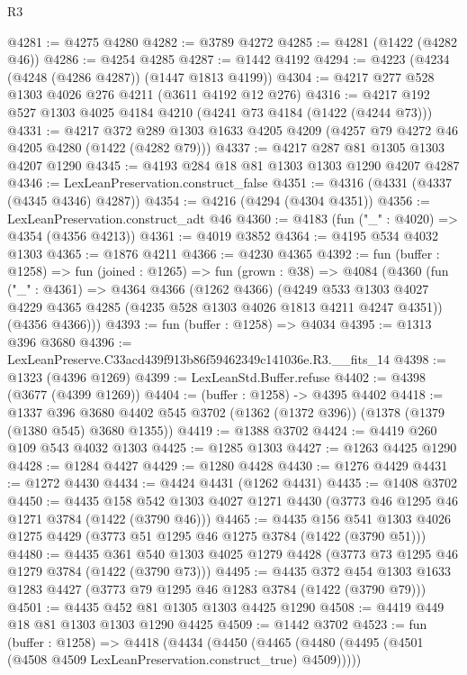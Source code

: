 \begin{lexlean}{R3}
\begin{coremodule}
@4281 := @4275 @4280
@4282 := @3789 @4272
@4285 := @4281 (@1422 (@4282 @46))
@4286 := @4254 @4285
@4287 := @1442 @4192
@4294 := @4223 (@4234 (@4248 (@4286 @4287)) (@1447 @1813 @4199))
@4304 := @4217 @277 @528 @1303 @4026 @276 @4211 (@3611 @4192 @12 @276)
@4316 := @4217 @192 @527 @1303 @4025 @4184 @4210 (@4241 @73 @4184 (@1422 (@4244 @73)))
@4331 := @4217
    @372
    @289
    @1303
    @1633
    @4205
    @4209
    (@4257 @79 @4272 @46 @4205 @4280 (@1422 (@4282 @79)))
@4337 := @4217 @287 @81 @1305 @1303 @4207 @1290
@4345 := @4193 @284 @18 @81 @1303 @1303 @1290 @4207 @4287
@4346 := LexLeanPreservation.construct_false
@4351 := @4316 (@4331 (@4337 (@4345 @4346) @4287))
@4354 := @4216 (@4294 (@4304 @4351))
@4356 := LexLeanPreservation.construct_adt @46
@4360 := @4183 (fun ("_" : @4020) => @4354 (@4356 @4213))
@4361 := @4019 @3852
@4364 := @4195 @534 @4032 @1303
@4365 := @1876 @4211
@4366 := @4230 @4365
@4392 := fun (buffer : @1258) =>
  fun (joined : @1265) =>
  fun (grown : @38) =>
  @4084
    (@4360
      (fun ("_" : @4361) =>
      @4364
        @4366
        (@1262 @4366)
        (@4249 @533 @1303 @4027 @4229 @4365 @4285 (@4235 @528 @1303 @4026 @1813 @4211 @4247 @4351))
        (@4356 @4366)))
@4393 := fun (buffer : @1258) => @4034
@4395 := @1313 @396 @3680
@4396 := LexLeanPreserve.C33acd439f913b86f59462349c141036e.R3.__fits_14
@4398 := @1323 (@4396 @1269)
@4399 := LexLeanStd.Buffer.refuse
@4402 := @4398 (@3677 (@4399 @1269))
@4404 := (buffer : @1258) -> @4395 @4402
@4418 := @1337
    @396
    @3680
    @4402
    @545
    @3702
    (@1362 (@1372 @396))
    (@1378 (@1379 (@1380 @545) @3680 @1355))
@4419 := @1388 @3702
@4424 := @4419 @260 @109 @543 @4032 @1303
@4425 := @1285 @1303
@4427 := @1263 @4425 @1290
@4428 := @1284 @4427
@4429 := @1280 @4428
@4430 := @1276 @4429
@4431 := @1272 @4430
@4434 := @4424 @4431 (@1262 @4431)
@4435 := @1408 @3702
@4450 := @4435
    @158
    @542
    @1303
    @4027
    @1271
    @4430
    (@3773 @46 @1295 @46 @1271 @3784 (@1422 (@3790 @46)))
@4465 := @4435
    @156
    @541
    @1303
    @4026
    @1275
    @4429
    (@3773 @51 @1295 @46 @1275 @3784 (@1422 (@3790 @51)))
@4480 := @4435
    @361
    @540
    @1303
    @4025
    @1279
    @4428
    (@3773 @73 @1295 @46 @1279 @3784 (@1422 (@3790 @73)))
@4495 := @4435
    @372
    @454
    @1303
    @1633
    @1283
    @4427
    (@3773 @79 @1295 @46 @1283 @3784 (@1422 (@3790 @79)))
@4501 := @4435 @452 @81 @1305 @1303 @4425 @1290
@4508 := @4419 @449 @18 @81 @1303 @1303 @1290 @4425
@4509 := @1442 @3702
@4523 := fun (buffer : @1258) =>
  @4418
    (@4434
      (@4450 (@4465 (@4480 (@4495 (@4501 (@4508 @4509 LexLeanPreservation.construct_true) @4509)))))

\end{coremodule}
\end{lexlean}
